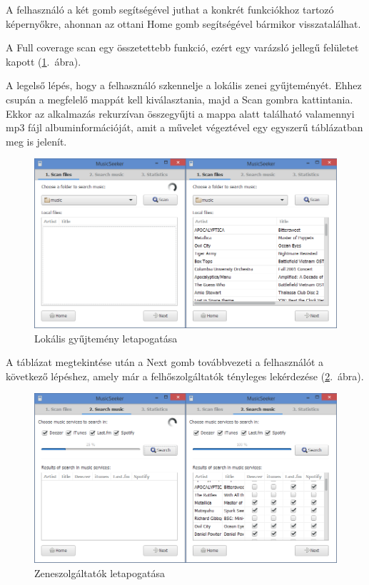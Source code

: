 A felhasználó a két gomb segítségével juthat a konkrét funkciókhoz tartozó képernyőkre, ahonnan az ottani Home gomb segítségével bármikor visszatalálhat.

A Full coverage scan egy összetettebb funkció, ezért egy varázsló jellegű felületet kapott (\ref{fig:scrscan}.~ábra).

A legelső lépés, hogy a felhasználó szkennelje a lokális zenei gyűjteményét. Ehhez  csupán a megfelelő mappát kell kiválasztania, majd a Scan gombra kattintania. Ekkor az alkalmazás rekurzívan összegyűjti a mappa alatt található valamennyi mp3 fájl albuminformációját, amit a művelet végeztével egy egyszerű táblázatban meg is jelenít.

\begin{figure}[htp]
\centering
\includegraphics[scale=0.4]{img/screenshots/screenshot02.png}
\caption{Lokális gyűjtemény letapogatása}
\label{fig:scrscan}
\end{figure}

A táblázat megtekintése után a Next gomb továbbvezeti a felhasználót a következő lépéshez, amely már a felhőszolgáltatók tényleges lekérdezése (\ref{fig:scrsearch}.~ábra).

\begin{figure}[htp]
\centering
\includegraphics[scale=0.4]{img/screenshots/screenshot03.png}
\caption{Zeneszolgáltatók letapogatása}
\label{fig:scrsearch}
\end{figure}

